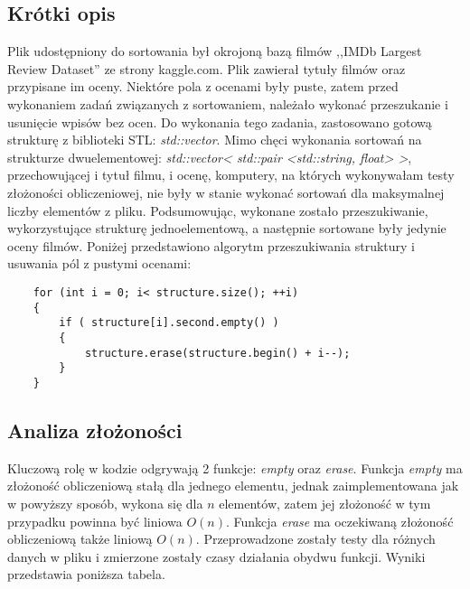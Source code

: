\subsection{Krótki opis}
Plik udostępniony do sortowania był okrojoną bazą filmów ,,IMDb Largest Review Dataset'' ze strony kaggle.com. Plik zawierał tytuły filmów oraz przypisane im oceny. Niektóre pola z ocenami były puste, zatem przed wykonaniem zadań związanych z sortowaniem, należało wykonać przeszukanie i usunięcie wpisów bez ocen. Do wykonania tego zadania, zastosowano gotową strukturę z biblioteki STL: \textit{std::vector}. Mimo chęci wykonania sortowań na strukturze dwuelementowej: \textit{std::vector< std::pair <std::string, float> >}, przechowującej i tytuł filmu, i ocenę, komputery, na których wykonywałam testy złożoności obliczeniowej, nie były w stanie wykonać sortowań dla maksymalnej liczby elementów z pliku. Podsumowując, wykonane zostało przeszukiwanie, wykorzystujące strukturę jednoelementową, a następnie sortowane były jedynie oceny filmów. Poniżej przedstawiono algorytm przeszukiwania struktury i usuwania pól z pustymi ocenami:

\begin{lstlisting}
    for (int i = 0; i< structure.size(); ++i)
    {
        if ( structure[i].second.empty() )    
        {
            structure.erase(structure.begin() + i--);
        }
    }
\end{lstlisting}

\subsection{Analiza złożoności}
Kluczową rolę w kodzie odgrywają 2 funkcje: \textit{empty} oraz \textit{erase}. Funkcja \textit{empty} ma złożoność obliczeniową stałą dla jednego elementu, jednak zaimplementowana jak w powyższy sposób, wykona się dla $n$ elementów, zatem jej złożoność w tym przypadku powinna być liniowa $O(n)$. Funkcja \textit{erase} ma oczekiwaną złożoność obliczeniową także liniową $O(n)$. Przeprowadzone zostały testy dla różnych danych w pliku i zmierzone zostały czasy działania obydwu funkcji. Wyniki przedstawia poniższa tabela.

